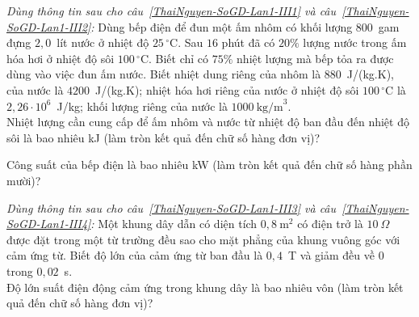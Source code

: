 	\begin{ex}%
		\label{ThaiNguyen-SoGD-Lan1-III1}\textit{Dùng thông tin sau cho câu~\ref{ThaiNguyen-SoGD-Lan1-III1} và câu~\ref{ThaiNguyen-SoGD-Lan1-III2}:} Dùng bếp điện để đun một ấm nhôm có khối lượng $800$~gam đựng $2{,}0$~lít nước ở nhiệt độ $25\,^\circ\text{C}$. Sau $16$ phút đã có $20\%$ lượng nước trong ấm hóa hơi ở nhiệt độ sôi $100\,^\circ\text{C}$. Biết chỉ có $75\%$ nhiệt lượng mà bếp tỏa ra được dùng vào việc đun ấm nước. Biết nhiệt dung riêng của nhôm là $880$~J/(kg.K), của nước là $4200$~J/(kg.K); nhiệt hóa hơi riêng của nước ở nhiệt độ sôi $100\,^\circ\text{C}$ là $2{,}26\cdot 10^6$~J/kg; khối lượng riêng của nước là $1000~\text{kg/m}^3$.\\
		Nhiệt lượng cần cung cấp để ấm nhôm và nước từ nhiệt độ ban đầu đến nhiệt độ sôi là bao nhiêu kJ (làm tròn kết quả đến chữ số hàng đơn vị)?
		\par
	\end{ex}

	\begin{ex}%
		\label{ThaiNguyen-SoGD-Lan1-III2}Công suất của bếp điện là bao nhiêu kW (làm tròn kết quả đến chữ số hàng phần mười)?
		\par
	\end{ex}

	\begin{ex}%
		\label{ThaiNguyen-SoGD-Lan1-III3}\textit{Dùng thông tin sau cho câu~\ref{ThaiNguyen-SoGD-Lan1-III3} và câu~\ref{ThaiNguyen-SoGD-Lan1-III4}:} Một khung dây dẫn có diện tích $0{,}8~\text{m}^2$ có điện trở là $10~\Omega$ được đặt trong một từ trường đều sao cho mặt phẳng của khung vuông góc với cảm ứng từ. Biết độ lớn của cảm ứng từ ban đầu là $0{,}4$~T và giảm đều về $0$ trong $0{,}02$~s.\\
		Độ lớn suất điện động cảm ứng trong khung dây là bao nhiêu vôn (làm tròn kết quả đến chữ số hàng đơn vị)?
		\par
	\end{ex}

